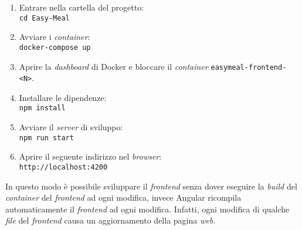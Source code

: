 \begin{enumerate}
	\item Entrare nella cartella del progetto: \\
		\texttt{cd Easy-Meal}

	\item Avviare i \textit{container}: \\
		\texttt{docker-compose up}

	\item Aprire la \textit{dashboard} di Docker e bloccare il \textit{container}
		\texttt{easymeal-frontend-<N>}.

	\item Installare le dipendenze: \\
		\texttt{npm install}

	\item Avviare il \textit{server} di sviluppo: \\
		\texttt{npm run start}

	\item Aprire il seguente indirizzo nel \textit{browser}: \\
		\texttt{http://localhost:4200}
\end{enumerate}

In questo modo è possibile sviluppare il \textit{frontend} senza dover eseguire
la \textit{build} del \textit{container} del \textit{frontend} ad ogni modifica, invece
Angular ricompila automaticamente il \textit{frontend} ad ogni modifica.
Infatti, ogni modifica di qualche \textit{file} del \textit{frontend} causa un 
aggiornamento della pagina \textit{web}.
